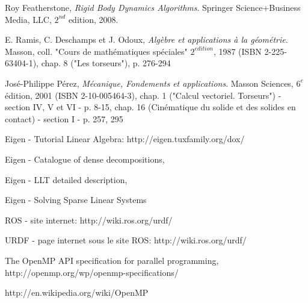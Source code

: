
\begin{thebibliography}{9}

  Roy Featherstone,
  \emph{Rigid Body Dynamics Algorithms}.
  Springer Science+Business Media, LLC,
  $2^{nd}$ edition,
  2008.

  E. Ramis, C. Deschamps et J. Odoux,
  \emph{Algèbre et applications à la géométrie}.
  Masson, coll. "Cours de mathématiques spéciales"
  $2^{edition}$, 1987 (ISBN 2-225-63404-1),
  chap. 8 ("Les torseurs"), p. 276-294
  
  José-Philippe Pérez,
  \emph{Mécanique, Fondements et applications}.
  Masson Sciences,
  $6^{e}$ édition, 2001 (ISBN 2-10-005464-3),
  chap. 1 ("Calcul vectoriel. Torseurs") - section IV, V et VI - p. 8-15, 
  chap. 16 (Cinématique du solide et des solides en contact) - section I - p. 257, 295
  
  Eigen - Tutorial Linear Algebra:
  http://eigen.tuxfamily.org/dox/%
  
  Eigen - Catalogue of dense decompositions,
  
  Eigen - LLT detailed description,

  Eigen - Solving Sparse Linear Systems

  ROS - site internet:
  http://wiki.ros.org/urdf/

  URDF - page internet sous le site ROS:
  http://wiki.ros.org/urdf/




  The OpenMP API specification for parallel programming,
  http://openmp.org/wp/openmp-specifications/

  http://en.wikipedia.org/wiki/OpenMP
  

\end{thebibliography}

